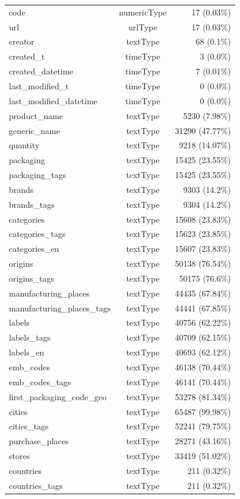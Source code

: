 \documentclass[11pt]{article}
\begin{document}
\begin{center}
\begin{longtable}{|l|c|r|}
code& numericType& 17 (0.03\%)\\
url& urlType& 17 (0.03\%)\\
creator& textType& 68 (0.1\%)\\
created\_t& timeType& 3 (0.0\%)\\
created\_datetime& timeType& 7 (0.01\%)\\
last\_modified\_t& timeType& 0 (0.0\%)\\
last\_modified\_datetime& timeType& 0 (0.0\%)\\
product\_name& textType& 5230 (7.98\%)\\
generic\_name& textType& 31290 (47.77\%)\\
quantity& textType& 9218 (14.07\%)\\
packaging& textType& 15425 (23.55\%)\\
packaging\_tags& textType& 15425 (23.55\%)\\
brands& textType& 9303 (14.2\%)\\
brands\_tags& textType& 9304 (14.2\%)\\
categories& textType& 15608 (23.83\%)\\
categories\_tags& textType& 15623 (23.85\%)\\
categories\_en& textType& 15607 (23.83\%)\\
origins& textType& 50138 (76.54\%)\\
origins\_tags& textType& 50175 (76.6\%)\\
manufacturing\_places& textType& 44435 (67.84\%)\\
manufacturing\_places\_tags& textType& 44441 (67.85\%)\\
labels& textType& 40756 (62.22\%)\\
labels\_tags& textType& 40709 (62.15\%)\\
labels\_en& textType& 40693 (62.12\%)\\
emb\_codes& textType& 46138 (70.44\%)\\
emb\_codes\_tags& textType& 46141 (70.44\%)\\
first\_packaging\_code\_geo& textType& 53278 (81.34\%)\\
cities& textType& 65487 (99.98\%)\\
cities\_tags& textType& 52241 (79.75\%)\\
purchase\_places& textType& 28271 (43.16\%)\\
stores& textType& 33419 (51.02\%)\\
countries& textType& 211 (0.32\%)\\
countries\_tags& textType& 211 (0.32\%)\\

\end{longtable}
\end{center}
\end{document}

